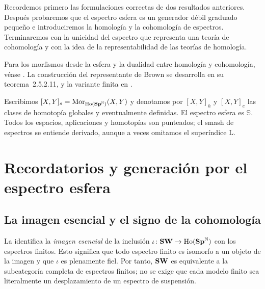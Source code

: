 
Recordemos primero las formulaciones correctas de dos resultados anteriores. Después probaremos que el espectro esfera es un generador débil graduado pequeño e introduciremos la homología y la cohomología de espectros. Terminaremos con la unicidad del espectro que representa una teoría de cohomología y con la idea de la representabilidad de las teorías de homología.

Para los morfismos desde la esfera y la dualidad entre homología y cohomología, véase \cite[corolario~3.2.2.4 y lema~4.2.3.1]{malkiewich}. La construcción del representante de Brown se desarrolla en su teorema~2.5.2.11, y la variante finita en \cite[teorema~1.6 y \S\S2--4]{adams1971}.

Escribimos $[X,Y]_s=\operatorname{Mor}_{\operatorname{Ho}(\mathbf{Sp}^{\mathbb N})}(X,Y)$ y denotamos por $[X,Y]_h$ y $[X,Y]_e$ las clases de homotopía globales y eventualmente definidas. El espectro esfera es $\mathbb S$. Todos los espacios, aplicaciones y homotopías son punteados; el smash de espectros se entiende derivado, aunque a veces omitamos el superíndice $\mathrm L$.

\section{Recordatorios y generación por el espectro esfera}

\subsection{La imagen esencial y el signo de la cohomología}
La  identifica la \emph{imagen esencial} de la inclusión $\iota\colon\mathbf{SW}\to\operatorname{Ho}(\mathbf{Sp}^{\mathbb N})$ con los espectros finitos. Esto significa que todo espectro finito es isomorfo a un objeto de la imagen y que $\iota$ es plenamente fiel. Por tanto, $\mathbf{SW}$ es equivalente a la subcategoría completa de espectros finitos; no se exige que cada modelo finito sea literalmente un desplazamiento de un espectro de suspensión.

